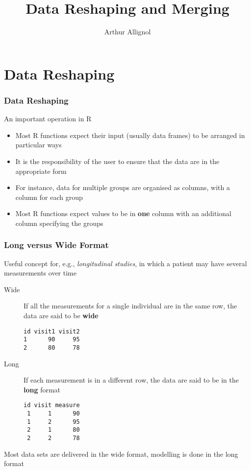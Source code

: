 \documentclass[paper=screen,mathserif]{beamer}\usepackage[]{graphicx}\usepackage[]{color}
\title[Reshape and Merge]{Data Reshaping and Merging}
\author{Arthur Allignol}
\institute[]{\scriptsize{\url{arthur.allignol@uni-ulm.de}}}
\date{}
\newcommand{\ft}[1]{\frametitle{#1}}
\begin{document}
\newcommand{\titlep}{yes}  %

{
\renewcommand{\insertframenumber}{}   %
\begin{frame}
\addtocounter{framenumber}{-1}
\titlepage
\end{frame}
}



\section{Data Reshaping}

\begin{frame}
  \ft{Data Reshaping}
  An important operation in R
  \begin{itemize}
  \item Most R functions expect their input (usually data frames) to
    be arranged in particular ways
  \item It is the responsibility of the user to ensure that the data
    are in the appropriate form
  \item For instance, data for multiple groups are organised as
    columns, with a column for each group
  \item Most R functions expect values to be in {\bf one} column with
    an additional column specifying the groups  
  \end{itemize}

\end{frame}

\begin{frame}[fragile]
  \ft{Long versus Wide Format} 
  
  Useful concept for, e.g., {\em longitudinal studies}, in which a
  patient may have several measurements over time
  \begin{description}
  \item[Wide] If all the measurements for a single individual are in
    the same row, the data are said to be {\bf wide}
    \small{
\begin{verbatim}
id visit1 visit2
1      90     95
2      80     78
\end{verbatim}}
  \item[Long] If each measurement is in a different row, the data are
    said to be in the {\bf long} format
\small{
\begin{verbatim}
id visit measure
 1     1      90
 1     2      95
 2     1      80
 2     2      78
\end{verbatim}}
  \end{description}
  Most data sets are delivered in the wide format, modelling is done
  in the long format
\end{frame}
\end{document}
